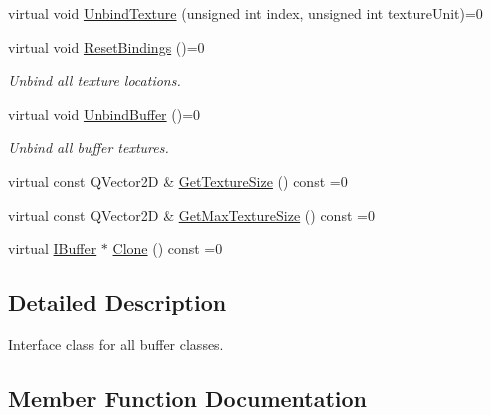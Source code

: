 \begin{DoxyCompactItemize}
\item 
virtual void \mbox{\hyperlink{class_geometry_engine_1_1_geometry_buffer_1_1_i_buffer_a1136bf19a08f111e08648e66a8518b09}{Unbind\+Texture}} (unsigned int index, unsigned int texture\+Unit)=0
\item 
\mbox{\label{class_geometry_engine_1_1_geometry_buffer_1_1_i_buffer_a832083ecc120ec3b93a5ee004f4cfc7f}} 
virtual void \mbox{\hyperlink{class_geometry_engine_1_1_geometry_buffer_1_1_i_buffer_a832083ecc120ec3b93a5ee004f4cfc7f}{Reset\+Bindings}} ()=0
\begin{DoxyCompactList}\small\item\em Unbind all texture locations. \end{DoxyCompactList}\item 
\mbox{\label{class_geometry_engine_1_1_geometry_buffer_1_1_i_buffer_a02cf21ee7103dd3563f5595a95c09b9f}} 
virtual void \mbox{\hyperlink{class_geometry_engine_1_1_geometry_buffer_1_1_i_buffer_a02cf21ee7103dd3563f5595a95c09b9f}{Unbind\+Buffer}} ()=0
\begin{DoxyCompactList}\small\item\em Unbind all buffer textures. \end{DoxyCompactList}\item 
virtual const Q\+Vector2D \& \mbox{\hyperlink{class_geometry_engine_1_1_geometry_buffer_1_1_i_buffer_af7546a1b668af70daa255747df92181d}{Get\+Texture\+Size}} () const =0
\item 
virtual const Q\+Vector2D \& \mbox{\hyperlink{class_geometry_engine_1_1_geometry_buffer_1_1_i_buffer_a0fe7b527d30dc9c5437b8723de2c8746}{Get\+Max\+Texture\+Size}} () const =0
\item 
virtual \mbox{\hyperlink{class_geometry_engine_1_1_geometry_buffer_1_1_i_buffer}{I\+Buffer}} $\ast$ \mbox{\hyperlink{class_geometry_engine_1_1_geometry_buffer_1_1_i_buffer_a41cb28df27adaea0555afd41169aebd6}{Clone}} () const =0
\end{DoxyCompactItemize}


\subsection{Detailed Description}
Interface class for all buffer classes. 

\subsection{Member Function Documentation}
\mbox{\label{class_geometry_engine_1_1_geometry_buffer_1_1_i_buffer_a3fba26797c5d4033b559c01d6f62dab5}} 
